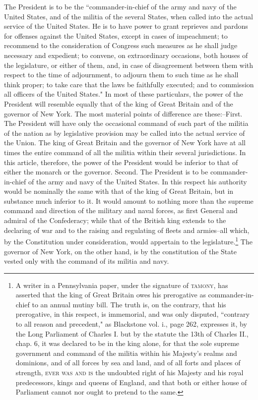 The President is to be the ``commander-in-chief of the army and navy of the United States, and of the militia of the several States, when called into the actual service of the United States. 
He is to have power to grant reprieves and pardons for offenses against the United States, except in cases of impeachment; to recommend to the consideration of Congress such measures as he shall judge necessary and expedient; to convene, on extraordinary occasions, both houses of the legislature, or either of them, and, in case of disagreement between them with respect to the time of adjournment, to adjourn them to such time as he shall think proper; to take care that the laws be faithfully executed; and to commission all officers of the United States." In most of these particulars, the power of the President will resemble equally that of the king of Great Britain and of the governor of New York. 
The most material points of difference are these:--First. 
The President will have only the occasional command of such part of the militia of the nation as by legislative provision may be called into the actual service of the Union. 
The king of Great Britain and the governor of New York have at all times the entire command of all the militia within their several jurisdictions. 
In this article, therefore, the power of the President would be inferior to that of either the monarch or the governor. 
Second. 
The President is to be commander-in-chief of the army and navy of the United States. 
In this respect his authority would be nominally the same with that of the king of Great Britain, but in substance much inferior to it. 
It would amount to nothing more than the supreme command and direction of the military and naval forces, as first General and admiral of the Confederacy; while that of the British king extends to the declaring of war and to the raising and regulating of fleets and armies--all which, by the Constitution under consideration, would appertain to the legislature.\footnote{A writer in a Pennsylvania paper, under the signature of \textsc{tamony}, has asserted that the king of Great Britain owes his prerogative as commander-in-chief to an annual mutiny bill. 
The truth is, on the contrary, that his prerogative, in this respect, is immemorial, and was only disputed, ``contrary to all reason and precedent," as Blackstone vol. 
i., page 262, expresses it, by the Long Parliament of Charles I. 
but by the statute the 13th of Charles II., chap. 
6, it was declared to be in the king alone, for that the sole supreme government and command of the militia within his Majesty's realms and dominions, and of all forces by sea and land, and of all forts and places of strength, \textsc{ever was and is} the undoubted right of his Majesty and his royal predecessors, kings and queens of England, and that both or either house of Parliament cannot nor ought to pretend to the same.} The governor of New York, on the other hand, is by the constitution of the State vested only with the command of its militia and navy. 

